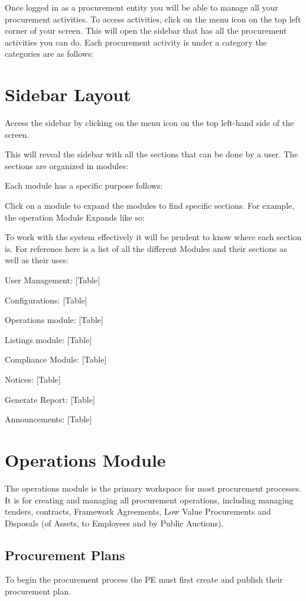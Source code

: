 \documentclass [12pt]{book}
\begin{document}
Once logged in as a procurement entity you will be able to manage all your procurement activities.
To access activities, click on the menu icon on the top left corner of your screen.
This will open the sidebar that has all the procurement activities you can do.
Each procurement activity is under a category the categories are as follows:

\section{Sidebar Layout}
Access the sidebar by clicking on the menu icon on the top left-hand side of the screen.

This will reveal the sidebar with all the sections that can be done by a user.
The sections are organized in modules:


Each module has a specific purpose follows:

Click on a module to expand the modules to find specific sections.
For example, the operation Module Expands like so:


To work with the system effectively it will be prudent to know where each section is.
For reference here is a list of all the different Modules and their sections as well as their uses:

User Management:
[Table]


Configurations:
[Table]


Operations module:
[Table] 


Listings module:
[Table]

Compliance Module:
[Table]

Notices:
[Table]

Generate Report:
[Table]


Announcements:
[Table]

\section{Operations Module}
The operations module is the primary workspace for most procurement processes.
It is for creating and managing all procurement operations, including managing tenders, contracts, Framework Agreements, Low Value Procurements and Disposals (of Assets, to Employees and by Public Auctions).

\subsection{Procurement Plans}
To begin the procurement process the PE must first create and publish their procurement plan.
\end{document}
